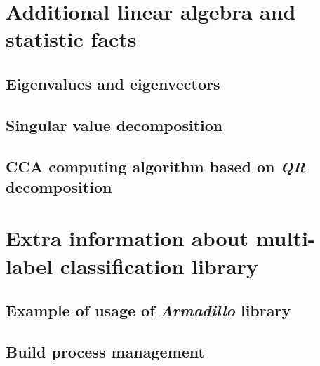 \begin{appendices}

\chapter{Additional linear algebra and statistic facts}
\section{Eigenvalues and eigenvectors}

\newpage
\section{Singular value decomposition}

\newpage
\section{CCA computing algorithm based on \textit{QR} decomposition}

\chapter{Extra information about multi-label classification library}

\section{Example of usage of \textit{Armadillo} library}



\newpage
\section{Build process management}

\end{appendices}
